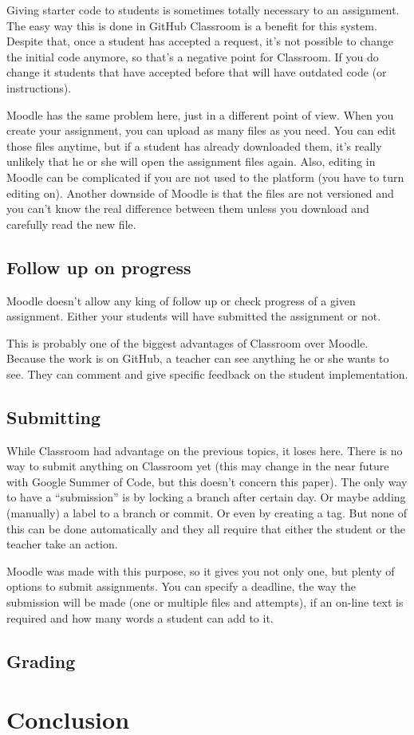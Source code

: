 \documentclass[12pt]{article}
\begin{document}
Giving starter code to students is sometimes totally necessary to an assignment. The easy way this is done in GitHub Classroom is a benefit for this system. Despite that, once a student has accepted a request, it's not possible to change the initial code anymore, so that's a negative point for Classroom. If you do change it students that have accepted before that will have outdated code (or instructions).

Moodle has the same problem here, just in a different point of view. When you create your assignment, you can upload as many files as you need. You can edit those files anytime, but if a student has already downloaded them, it's really unlikely that he or she will open the assignment files again. Also, editing in Moodle can be complicated if you are not used to the platform (you have to turn editing on). Another downside of Moodle is that the files are not versioned and you can't know the real difference between them unless you download and carefully read the new file.

\subsection{Follow up on progress}

Moodle doesn't allow any king of follow up or check progress of a given assignment. Either your students will have submitted the assignment or not.

This is probably one of the biggest advantages of Classroom over Moodle. Because the work is on GitHub, a teacher can see anything he or she wants to see. They can comment and give specific feedback on the student implementation.

\subsection{Submitting}

While Classroom had advantage on the previous topics, it loses here. There is no way to submit anything on Classroom yet (this may change in the near future with Google Summer of Code, but this doesn't concern this paper). The only way to have a ``submission'' is by locking a branch after certain day. Or maybe adding (manually) a label to a branch or commit. Or even by creating a tag. But none of this can be done automatically and they all require that either the student or the teacher take an action.

Moodle was made with this purpose, so it gives you not only one, but plenty of options to submit assignments. You can specify a deadline, the way the submission will be made (one or multiple files and attempts), if an on-line text is required and how many words a student can add to it.

\subsection{Grading}



\section{Conclusion}
\end{document}

